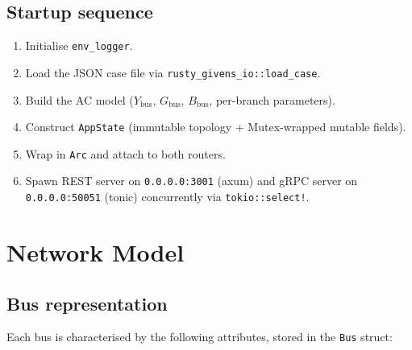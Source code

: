 \documentclass[11pt,a4paper]{article}
\begin{document}
\subsection{Startup sequence}

\begin{enumerate}
  \item Initialise \texttt{env\_logger}.
  \item Load the JSON case file via \texttt{rusty\_givens\_io::load\_case}.
  \item Build the AC model ($Y_\text{bus}$, $G_\text{bus}$, $B_\text{bus}$,
        per-branch parameters).
  \item Construct \texttt{AppState} (immutable topology + Mutex-wrapped
        mutable fields).
  \item Wrap in \texttt{Arc} and attach to both routers.
  \item Spawn REST server on \texttt{0.0.0.0:3001} (axum) and gRPC server
        on \texttt{0.0.0.0:50051} (tonic) concurrently via
        \texttt{tokio::select!}.
\end{enumerate}



\section{Network Model}\label{sec:network}

\subsection{Bus representation}

Each bus is characterised by the following attributes, stored in the
\texttt{Bus} struct:
\end{document}

